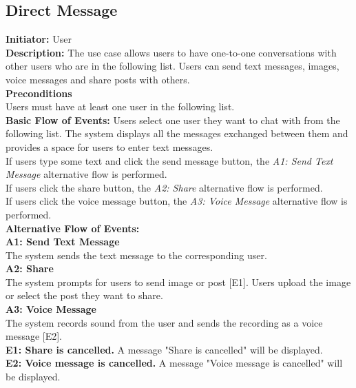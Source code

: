 \documentclass[a4paper,11pt]{scrreprt}
\begin{document}
\subsection{Direct Message}
\textbf{\large Initiator: }User\\
\textbf{\large Description: }The use case allows users to have one-to-one conversations with other users who are in the following list. Users can send text messages, images, voice messages and share posts with others.\\
\textbf{\large Preconditions }\\
Users must have at least one user in the following list.\\
\textbf{\large Basic Flow of Events: }Users select one user they want to chat with from the following list. The system displays all the messages exchanged between them and provides a space for users to enter text messages.\\
If users type some text and click the send message button, the \textit{A1: Send Text Message} alternative flow is performed.\\
If users click the share button, the \textit{A2: Share} alternative flow is performed.\\
If users click the voice message button, the \textit{A3: Voice Message} alternative flow is performed.\\
\textbf{\large Alternative Flow of Events: }\\
\textbf{A1: Send Text Message}\\
The system sends the text message to the corresponding user.\\
\textbf{A2: Share}\\
The system prompts for users to send image or post [E1]. Users upload the image or select the post they want to share.\\
\textbf{A3: Voice Message}\\
The system records sound from the user and sends the recording as a voice message [E2].\\
\textbf{E1: Share is cancelled.} A message "Share is cancelled" will be displayed.\\
\textbf{E2: Voice message is cancelled.} A message "Voice message is cancelled" will be displayed.\\

\begin{figure}[H]
    \centering
    
\end{figure}
\end{document}
